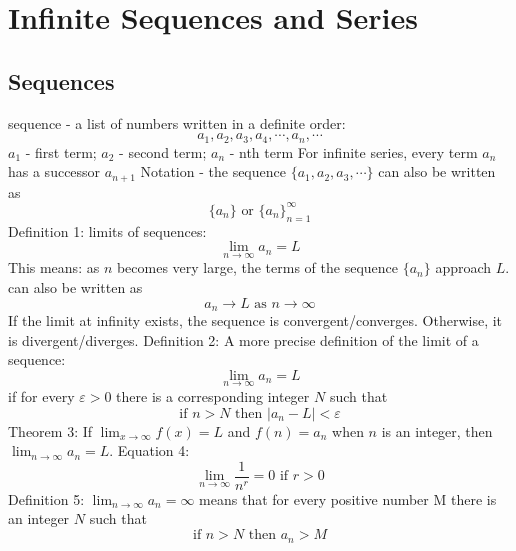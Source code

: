 \documentclass{article}
\begin{document}
    \section{Infinite Sequences and Series} %
    \begin{multicols}{2}
    \subsection{Sequences} %
    \begin{outline}
        \1 sequence - a list of numbers written in a definite order: \[a_1, a_2, a_3, a_4, \cdots, a_n, \cdots \]
        \1 $a_1$ - first term; $a_2$ - second term; $a_n$ - nth term 
        \1 For infinite series, every term $a_n$ has a successor $a_{n+1}$
        \1 Notation - the sequence \(\{a_1, a_2, a_3, \cdots\}\) can also be written as \[\{a_n\}\text{ or }\{a_n\}^\infty_{n=1}\] 
        \1 Definition 1: limits of sequences: \[\lim_{n\to\infty}a_n=L\]
            \2 This means: as $n$ becomes very large, the terms of the sequence $\{a_n\}$ approach $L$. 
        \1 can also be written as \[a_n\to L \text{ as } n\to\infty\]
        \1 If the limit at infinity exists, the sequence is convergent/converges. Otherwise, it is divergent/diverges. 
        \1 Definition 2: A more precise definition of the limit of a sequence: \[\lim_{n\to\infty}a_n=L\] if for every \(\varepsilon>0\) there is a corresponding integer $N$ such that \[\text{if }n>N\text{ then }|a_n-L|<\varepsilon\]
        \1 Theorem 3: If \(\lim_{x\to\infty}f(x)=L\) and \(f(n)=a_n\) when $n$ is an integer, then \(\lim_{n\to\infty}a_n=L\). 
        \1 Equation 4: \[\lim_{n\to\infty}\dfrac{1}{n^r}=0\text{    if }r>0\]
        \1 Definition 5: \(\lim_{n\to\infty}a_n=\infty\) means that for every positive number M there is an integer $N$ such that \[\text{if }n>N\text{ then }a_n>M\]
    \end{outline}\end{multicols}
\end{document}
